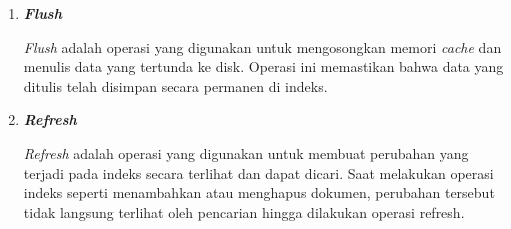 \begin{enumerate}
    \item \textbf{\textit{Flush}}
    
    \textit{Flush} adalah operasi yang digunakan untuk mengosongkan memori \textit{cache} dan menulis data yang tertunda ke disk. Operasi ini memastikan bahwa data yang ditulis telah disimpan secara permanen di indeks.
    
    \item \textbf{\textit{Refresh}}
    
    \textit{Refresh} adalah operasi yang digunakan untuk membuat perubahan yang terjadi pada indeks secara terlihat dan dapat dicari. Saat melakukan operasi indeks seperti menambahkan atau menghapus dokumen, perubahan tersebut tidak langsung terlihat oleh pencarian hingga dilakukan operasi refresh.
\end{enumerate}